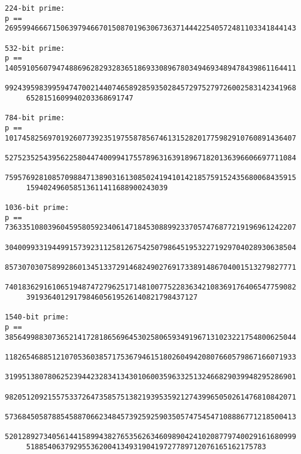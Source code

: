 \documentclass{article}
\begin{document}
\begin{small}
\begin{verbatim}
224-bit prime:
p == 26959946667150639794667015087019630673637144422540572481103341844143

532-bit prime:
p == 14059105607947488696282932836518693308967803494693489478439861164411
     99243959839959474700214407465892859350284572975279726002583142341968
     6528151609940203368691747

784-bit prime:
p == 10174582569701926077392351975587856746131528201775982910760891436407
     52752352543956225804474009941755789631639189671820136396606697711084
     75957692810857098847138903161308502419410142185759152435680068435915
     159402496058513611411688900243039
     
1036-bit prime:
p == 73633510803960459580592340614718453088992337057476877219196961242207
     30400993319449915739231125812675425079864519532271929704028930638504
     85730703075899286013451337291468249027691733891486704001513279827771
     74018362916106519487472796251714810077522836342108369176406547759082
     3919364012917984605619526140821798437127

1540-bit prime:
p == 38564998830736521417281865696453025806593491967131023221754800625044
     11826546885121070536038571753679461518026049420807660579867166071933
     31995138078062523944232834134301060035963325132466829039948295286901
     98205120921557533726473585751382193953592127439965050261476810842071
     57368450587885458870662348457392592590350574754547108886771218500413
     52012892734056144158994382765356263460989042410208779740029161680999
     51885406379295536200413493190419727789712076165162175783
     

\end{verbatim}
\end{small}
\end{document}
